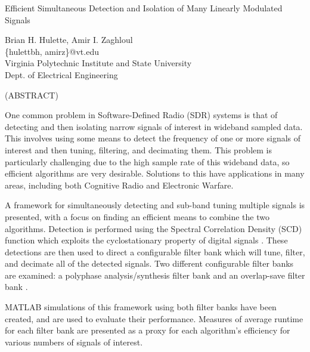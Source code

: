 \documentclass[12pt]{article}
\begin{document}
\newcommand{\fourier}{\mathcal{F}}
\newcommand{\at}{{\fontfamily{ptm}\selectfont @}}


\thispagestyle{empty}
\begin{center}

{\large Efficient Simultaneous Detection and Isolation of
Many Linearly Modulated Signals}

\vfill

Brian H. Hulette, Amir I. Zaghloul \\
\{hulettbh, amirz\}\at vt.edu \\
Virginia Polytechnic Institute and State University \\
Dept. of Electrical Engineering

\vfill

(ABSTRACT)

\vfill

\end{center}

One common problem in Software-Defined Radio (SDR) systems is that of detecting
and then isolating narrow signals of interest in wideband sampled data. This
involves using some means to detect the frequency of one or more signals of
interest and then tuning, filtering, and decimating them. This problem is
particularly challenging due to the high sample rate of this wideband data, so
efficient algorithms are very desirable. Solutions to this have applications in
many areas, including both Cognitive Radio and Electronic Warfare.

A framework for simultaneously detecting and sub-band tuning multiple signals
is presented, with a focus on finding an efficient means to combine the two
algorithms.  Detection is performed using the Spectral Correlation Density
(SCD) function which exploits the cyclostationary property of digital signals
\cite{Gardner1}.  These detections are then used to direct a configurable
filter bank which will tune, filter, and decimate all of the detected signals.
Two different configurable filter banks are examined: a polyphase
analysis/synthesis filter bank \cite{Harris2} and an overlap-save filter bank
\cite{Borgerding1}.

MATLAB simulations of this framework using both filter banks have been created,
and are used to evaluate their performance. Measures of average runtime for
each filter bank are presented as a proxy for each algorithm's efficiency for
various numbers of signals of interest.

\vfill
\end{document}
